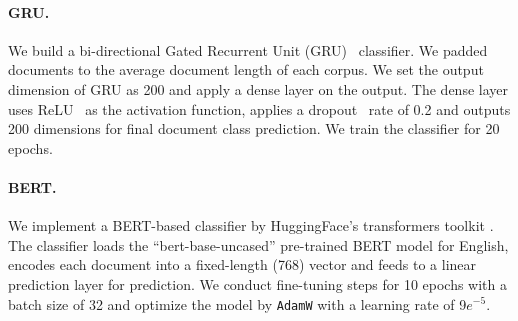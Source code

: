 \paragraph{GRU.} 
We build a bi-directional Gated Recurrent Unit (GRU)~\cite{cho2014properties} classifier. We padded documents to the average document length of each corpus. We set the output dimension of GRU as 200 and apply a dense layer on the output. The dense layer uses ReLU~\cite{hahnloser2000digital} as the activation function, applies a dropout~\cite{srivastava2014dropout} rate of 0.2 and outputs 200 dimensions for final document class prediction. We train the classifier for 20 epochs.


\paragraph{BERT.} 
We implement a BERT-based classifier by HuggingFace's transformers toolkit \cite{Wolf2019HuggingFacesTS}. The classifier loads the ``bert-base-uncased'' pre-trained BERT model for English, encodes each document into a fixed-length (768) vector and feeds to a linear prediction layer for prediction.  We conduct fine-tuning steps for 10 epochs with a batch size of 32 and optimize the model by \texttt{AdamW} with a learning rate of 9$e^{-5}$. 



